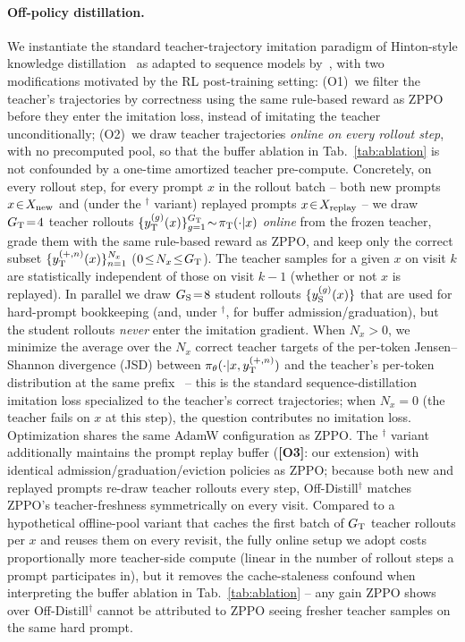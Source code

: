 \documentclass{llmxive}
\begin{document}
\paragraph{Off-policy distillation.}
We instantiate the standard teacher-trajectory imitation paradigm of Hinton-style knowledge distillation~\citep{hinton2015distilling} as adapted to sequence models by~\citet{sanh2019distilbert}, with two modifications motivated by the RL post-training setting: (O1)~we filter the teacher's trajectories by correctness using the same rule-based reward as ZPPO before they enter the imitation loss, instead of imitating the teacher unconditionally; (O2)~we draw teacher trajectories \emph{online on every rollout step}, with no precomputed pool, so that the buffer ablation in Tab.~\ref{tab:ablation} is not confounded by a one-time amortized teacher pre-compute. Concretely, on every rollout step, for every prompt $x$ in the rollout batch -- both new prompts $x\!\in\!X_{\rm new}$ and (under the $^{\dagger}$ variant) replayed prompts $x\!\in\!X_{\rm replay}$ -- we draw $G_{\rm T}\!=\!4$ teacher rollouts $\{y_{\rm T}^{(g)}(x)\}_{g=1}^{G_{\rm T}}\!\sim\!\pi_{\rm T}(\cdot|x)$ \emph{online} from the frozen teacher, grade them with the same rule-based reward as ZPPO, and keep only the correct subset $\{y_{\rm T}^{(+,n)}(x)\}_{n=1}^{N_x}$ ($0\!\leq\!N_x\!\leq\!G_{\rm T}$). The teacher samples for a given $x$ on visit $k$ are statistically independent of those on visit $k\!-\!1$ (whether or not $x$ is replayed). In parallel we draw $G_{\rm S}\!=\!8$ student rollouts $\{y_{\rm S}^{(g)}(x)\}$ that are used for hard-prompt bookkeeping (and, under $^{\dagger}$, for buffer admission/graduation), but the student rollouts \emph{never} enter the imitation gradient. When $N_x\!>\!0$, we minimize the average over the $N_x$ correct teacher targets of the per-token Jensen--Shannon divergence (JSD) between $\pi_\theta(\cdot|x, y_{\rm T}^{(+,n)})$ and the teacher's per-token distribution at the same prefix~\citep{hinton2015distilling,sanh2019distilbert,ko2024distillm} -- this is the standard sequence-distillation imitation loss specialized to the teacher's correct trajectories; when $N_x\!=\!0$ (the teacher fails on $x$ at this step), the question contributes no imitation loss. Optimization shares the same AdamW configuration as ZPPO. The $^{\dagger}$ variant additionally maintains the prompt replay buffer (\textbf{[O3]}: our extension) with identical admission/graduation/eviction policies as ZPPO; because both new and replayed prompts re-draw teacher rollouts every step, Off-Distill$^{\dagger}$ matches ZPPO's teacher-freshness symmetrically on every visit. Compared to a hypothetical offline-pool variant that caches the first batch of $G_{\rm T}$ teacher rollouts per $x$ and reuses them on every revisit, the fully online setup we adopt costs proportionally more teacher-side compute (linear in the number of rollout steps a prompt participates in), but it removes the cache-staleness confound when interpreting the buffer ablation in Tab.~\ref{tab:ablation} -- any gain ZPPO shows over Off-Distill$^{\dagger}$ cannot be attributed to ZPPO seeing fresher teacher samples on the same hard prompt.
\end{document}

